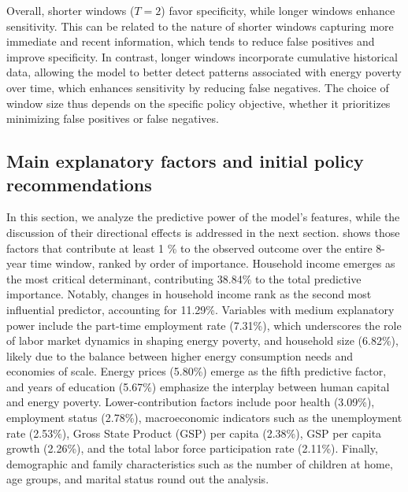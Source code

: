 \documentclass[preprint,authoryear,12pt]{elsarticle}
\begin{document}
Overall, shorter windows ($T = 2$) favor specificity, while longer windows enhance sensitivity. This can be related to the nature of shorter windows capturing more immediate and recent information, which tends to reduce false positives and improve specificity. In contrast, longer windows incorporate cumulative historical data, allowing the model to better detect patterns associated with energy poverty over time, which enhances sensitivity by reducing false negatives. The choice of window size thus depends on the specific policy objective, whether it prioritizes minimizing false positives or false negatives.

\subsection{Main explanatory factors and initial policy recommendations}  \label{Main_explanatory_factors}

In this section, we analyze the predictive power of the model's features, while the discussion of their directional effects is addressed in the next section. shows those factors that contribute at least 1 \%  to the observed outcome over the entire 8-year time window, ranked by order of importance. Household income emerges as the most critical determinant, contributing 38.84\% to the total predictive importance. Notably, changes in household income rank as the second most influential predictor, accounting for 11.29\%. Variables with medium explanatory power include the part-time employment rate (7.31\%), which underscores the role of labor market dynamics in shaping energy poverty, and household size (6.82\%), likely due to the balance between higher energy consumption needs and economies of scale. Energy prices (5.80\%) emerge as the fifth predictive factor, and years of education (5.67\%) emphasize the interplay between human capital and energy poverty. Lower-contribution factors include poor health (3.09\%), employment status (2.78\%), macroeconomic indicators such as the unemployment rate (2.53\%), Gross State Product (GSP) per capita (2.38\%), GSP per capita growth (2.26\%), and the total labor force participation rate (2.11\%). Finally, demographic and family characteristics such as the number of children at home, age groups, and marital status round out the analysis.
\end{document}
